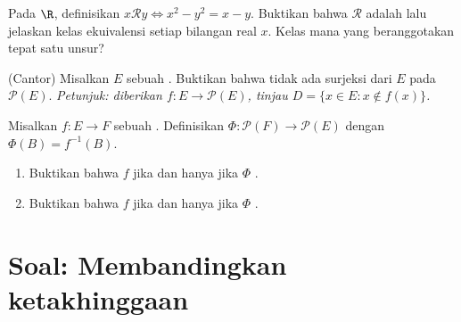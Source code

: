 \begin{exercise}[$\star\star$]\label{exo:b1:logic:10}
Pada $\R$, definisikan $x \mathbin{\mathcal{R}} y \iff x^2 - y^2 = x - y$.
Buktikan bahwa $\mathcal{R}$ adalah  lalu jelaskan
kelas ekuivalensi setiap bilangan real $x$. Kelas mana yang
beranggotakan tepat satu unsur?
\end{exercise}

\begin{exercise}[$\star\star\star$]\label{exo:b1:logic:11}
(Cantor) Misalkan $E$ sebuah . Buktikan bahwa tidak ada
surjeksi dari $E$ pada $\mathcal{P}(E)$. \emph{Petunjuk: diberikan
$f \colon E \to
\mathcal{P}(E)$, tinjau $D = \{x \in E : x \notin f(x)\}$.}
\end{exercise}

\begin{exercise}[$\star\star\star$]\label{exo:b1:logic:12}
Misalkan $f \colon E \to F$ sebuah . Definisikan $\Phi \colon \mathcal{P}(F)
\to \mathcal{P}(E)$ dengan $\Phi(B) = f^{-1}(B)$.
\begin{enumerate}
  \item Buktikan bahwa $f$  jika dan hanya jika $\Phi$
        .
  \item Buktikan bahwa $f$  jika dan hanya jika $\Phi$
        .
\end{enumerate}
\end{exercise}

\section{Soal: Membandingkan ketakhinggaan}


